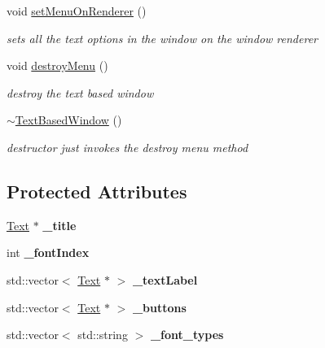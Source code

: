 \begin{DoxyCompactItemize}
\hypertarget{class_text_based_window_ae7fbedb72a6073234ef2da5697d4bbb6}{}\label{class_text_based_window_ae7fbedb72a6073234ef2da5697d4bbb6} 
void \hyperlink{class_text_based_window_ae7fbedb72a6073234ef2da5697d4bbb6}{set\+Menu\+On\+Renderer} ()
\begin{DoxyCompactList}\small\item\em sets all the text options in the window on the window renderer \end{DoxyCompactList}\item 
\hypertarget{class_text_based_window_a977eef5200047927a40c51b20e1b129f}{}\label{class_text_based_window_a977eef5200047927a40c51b20e1b129f} 
void \hyperlink{class_text_based_window_a977eef5200047927a40c51b20e1b129f}{destroy\+Menu} ()
\begin{DoxyCompactList}\small\item\em destroy the text based window \end{DoxyCompactList}\item 
\hypertarget{class_text_based_window_ac704b70a18c11eb3133e7e5dfe5780d9}{}\label{class_text_based_window_ac704b70a18c11eb3133e7e5dfe5780d9} 
\hyperlink{class_text_based_window_ac704b70a18c11eb3133e7e5dfe5780d9}{$\sim$\+Text\+Based\+Window} ()
\begin{DoxyCompactList}\small\item\em destructor just invokes the destroy menu method \end{DoxyCompactList}\end{DoxyCompactItemize}
\subsection*{Protected Attributes}
\begin{DoxyCompactItemize}
\item 
\hypertarget{class_text_based_window_ac0481be18d53f3e04124dd899b1253da}{}\label{class_text_based_window_ac0481be18d53f3e04124dd899b1253da} 
\hyperlink{class_text}{Text} $\ast$ {\bfseries \+\_\+title}
\item 
\hypertarget{class_text_based_window_adc84d743428eefd63fe4245297593f4a}{}\label{class_text_based_window_adc84d743428eefd63fe4245297593f4a} 
int {\bfseries \+\_\+font\+Index}
\item 
\hypertarget{class_text_based_window_a0eb57b99b6b2cde43ae330d20e205e95}{}\label{class_text_based_window_a0eb57b99b6b2cde43ae330d20e205e95} 
std\+::vector$<$ \hyperlink{class_text}{Text} $\ast$ $>$ {\bfseries \+\_\+text\+Label}
\item 
\hypertarget{class_text_based_window_abafdebbba55dd593df5ee69d76583bd9}{}\label{class_text_based_window_abafdebbba55dd593df5ee69d76583bd9} 
std\+::vector$<$ \hyperlink{class_text}{Text} $\ast$ $>$ {\bfseries \+\_\+buttons}
\item 
\hypertarget{class_text_based_window_a5a02547162c9a19f6b7d94ae4eac84ee}{}\label{class_text_based_window_a5a02547162c9a19f6b7d94ae4eac84ee} 
std\+::vector$<$ std\+::string $>$ {\bfseries \+\_\+font\+\_\+types}
\end{DoxyCompactItemize}


